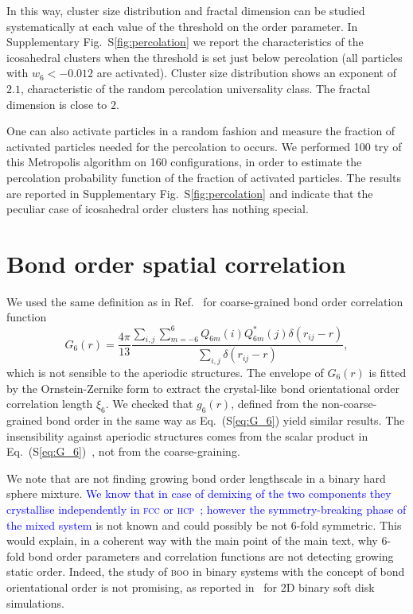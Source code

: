 \documentclass[prl,twocolumn,notitlepage]{revtex4-1}
\begin{document}
In this way, cluster size distribution and fractal dimension can be studied systematically at each value of the threshold on the order parameter. In Supplementary Fig.~S\ref{fig:percolation} we report the characteristics of the icosahedral clusters when the threshold is set just below percolation (all particles with $w_6<-0.012$ are activated). Cluster size distribution shows an exponent of $2.1$, characteristic of the random percolation universality class. The fractal dimension is close to $2$.

One can also activate particles in a random fashion and measure the fraction of activated particles needed for the percolation to occurs. We performed 100 try of this Metropolis algorithm on 160 configurations, in order to estimate the percolation probability function of the fraction of activated particles. The results are reported in Supplementary Fig.~S\ref{fig:percolation} and indicate that the peculiar case of icosahedral order clusters has nothing special.

\section*{Bond order spatial correlation}

We used the same definition as in Ref.~\cite{tanaka2010critical} for coarse-grained bond order correlation function
\begin{equation}
	G_6(r) = \frac{4\pi}{13}\frac{\sum_{i,j} \sum_{m=-6}^{6} Q_{6 m}(i) Q_{6 m}^{*}(j) \delta(r_{ij}-r)}{\sum_{i,j} \delta(r_{ij}-r)},
	\label{eq:G_6}
\end{equation}
which is not sensible to the aperiodic structures. The envelope of $G_6(r)$ is fitted by the Ornstein-Zernike form to extract the crystal-like bond orientational order correlation length $\xi_6$. We checked that $g_6(r)$, defined from the non-coarse-grained bond order in the same way as Eq.~(S\ref{eq:G_6}) yield similar results. The insensibility against aperiodic structures comes from the scalar product in Eq.~(S\ref{eq:G_6})~\cite{Tomida1995}, not from the coarse-graining.

We note that \citet{Charbonneau} are not finding growing bond order lengthscale in a binary hard sphere mixture. \textcolor{blue}{We know that in case of demixing of the two components they crystallise independently in \textsc{fcc} or \textsc{hcp}~\cite{Hopkins2011b,Hopkins2012}; however the symmetry-breaking phase of the mixed system} is not known and could possibly be not 6-fold symmetric. This would explain, in a coherent way with the main point of the main text, why 6-fold bond order parameters and correlation functions are not detecting growing static order. Indeed, the study of \textsc{boo} in binary systems with the concept of bond orientational order is not promising, as reported in~\citep{tanaka2010critical, KawasakiJPCM} for 2D binary soft disk simulations.
\end{document}
